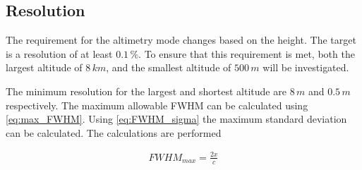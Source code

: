 \subsection{Resolution} 
\label{ssec:resolution}
The requirement for the altimetry mode changes based on the height. The target is a resolution of at least $0.1\,\%$. To ensure that this requirement is met, both the largest altitude of $8\,km$, and the smallest altitude of $500\,m$ will be investigated.

The minimum resolution for the largest and shortest altitude are $8\,m$ and $0.5\,m$ respectively. The maximum allowable FWHM can be calculated using \cref{eq:max_FWHM}.
 Using \cref{eq:FWHM_sigma} the maximum standard deviation can be calculated. The calculations are performed

\begin{align}\label{eq:max_FWHM}
FWHM_{max} = \frac{2x}{c}
\end{align}








